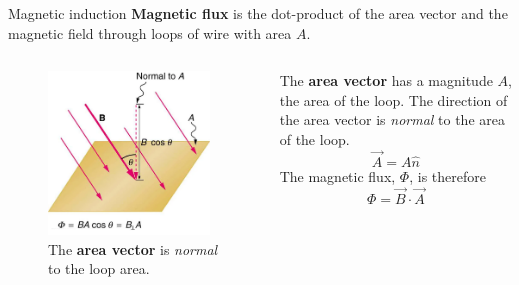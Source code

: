 \documentclass{beamer}
\begin{document}
\begin{frame}{Magnetic induction}
\small
\textbf{\alert{Magnetic flux}} is the dot-product of the area vector and the magnetic field through loops of wire with area $A$.
\begin{columns}[T]
\begin{column}{0.5\textwidth}
\begin{figure}
\centering
\includegraphics[width=0.95\textwidth]{figures/flux.png}
\caption{\label{fig:farad3} The \textbf{area vector} is \textit{normal} to the loop area.}
\end{figure}
\end{column}
\begin{column}{0.5\textwidth}
\vspace{0.5cm}
The \textbf{area vector} has a magnitude $A$, the area of the loop.  The direction of the area vector is \textit{normal} to the area of the loop.
\begin{equation}
\vec{A} = A \hat{n}
\end{equation}
The magnetic flux, $\Phi$, is therefore
\begin{equation}
\Phi = \vec{B} \cdot \vec{A}
\end{equation}
\end{column}
\end{columns}
\end{frame}
\end{document}
